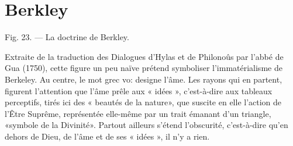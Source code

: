 
\chapter{Berkley}

Fig. 23. — La doctrine de Berkley.

Extraite de la traduction des Dialogues d'Hylas et
de Philonoûs par l'abbé de Gua (1750), cette figure
un peu naïve prétend symboliser l'immatérialisme
de Berkeley. Au centre, le mot grec vo: designe
l'âme. Les rayons qui en partent, figurent l'attention
que l'âme prêle aux « idées », c'est-à-dire aux tableaux
perceptifs, tirés ici des « beautés de la nature», que
suscite en elle l'action de l'Être Suprême, représentée
elle-même par un trait émanant d'un triangle,
«symbole de la Divinité». Partout ailleurs s'étend
l'obscurité, c'est-à-dire qu'en dehors de Dieu, de l'âme
et de ses « idées », il n'y a rien.


